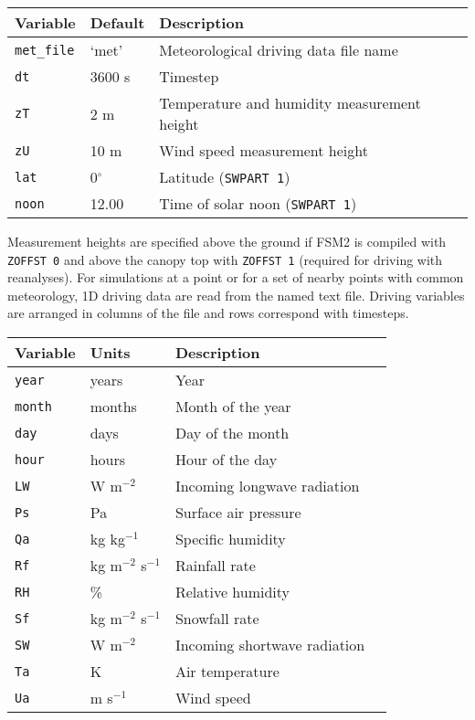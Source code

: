 \documentclass{article}
\begin{document}
\begin{longtable}{|l|l|l|l|} \hline
Variable        & Default & Description                                 \\ \hline
{\tt met\_file} & `met'   & Meteorological driving data file name       \\
{\tt dt}        & 3600 s  & Timestep                                    \\
{\tt zT}        & 2 m     & Temperature and humidity measurement height \\
{\tt zU}        & 10 m    & Wind speed measurement height               \\
{\tt lat}       &0$^\circ$& Latitude ({\tt SWPART 1})                   \\
{\tt noon}      & 12.00   & Time of solar noon ({\tt SWPART 1})         \\ \hline 
\end{longtable}

Measurement heights are specified above the ground if FSM2 is compiled with {\tt ZOFFST 0} and above the canopy top with {\tt ZOFFST 1} (required for driving with reanalyses). For simulations at a point or for a set of nearby points with common meteorology, 1D driving data are read from the named text file. Driving variables are arranged in columns of the file and rows correspond with timesteps.

\begin{longtable}{|l|l|l|l|} \hline
Variable    & Units    & Description                  \\ \hline
{\tt year}  & years    & Year                         \\
{\tt month} & months   & Month of the year            \\
{\tt day}   & days     & Day of the month             \\
{\tt hour}  & hours    & Hour of the day              \\
{\tt LW} & W m$^{-2}$  & Incoming longwave radiation  \\
{\tt Ps} & Pa          & Surface air pressure         \\
{\tt Qa} & kg kg$^{-1}$& Specific humidity            \\
{\tt Rf} & kg m$^{-2}$ s$^{-1}$ & Rainfall rate       \\
{\tt RH} & \%          & Relative humidity            \\
{\tt Sf} & kg m$^{-2}$ s$^{-1}$ & Snowfall rate       \\
{\tt SW} & W m$^{-2}$  & Incoming shortwave radiation \\
{\tt Ta} & K           & Air temperature              \\
{\tt Ua} & m s$^{-1}$  & Wind speed                   \\ \hline 
\end{longtable}
\end{document}
